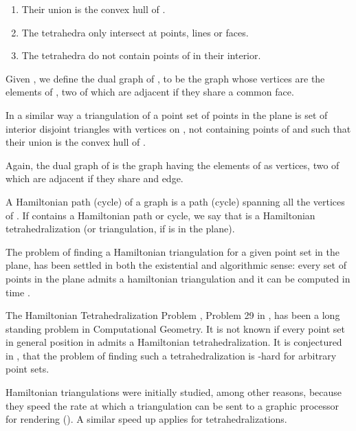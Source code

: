 \documentclass{article}
\begin{document}
\begin{enumerate}
\item Their union is the convex hull of .

 \item The tetrahedra only intersect at points, lines
or faces.

    \item The tetrahedra do not contain points of  in
their interior.
\end{enumerate}

Given , we define the dual
graph of ,  to
be the graph whose vertices are the elements of 
, two of which are adjacent if they
share a common face.\par

In a similar way a triangulation of a point set of points   
in the plane is set of interior 
disjoint triangles
with vertices on , not containing points of 
and such that their union is the convex hull of .\par

Again, the dual graph  of  is the graph having
 the elements of  as vertices, two of which
are adjacent if they share and edge.\par

A Hamiltonian path (cycle) of a graph  is a path (cycle)
spanning all the vertices of . If  contains
a Hamiltonian path or cycle, we say that 
is a Hamiltonian tetrahedralization (or triangulation, if  is in
the plane).\par

The problem of finding a Hamiltonian triangulation for
a given point set in the plane, has been
settled in both the existential and algorithmic
sense: every set of  points in the plane 
admits a hamiltonian 
triangulation and it can be computed
in time  \cite{skiena, faurr}.

The Hamiltonian Tetrahedralization Problem 
\cite{skiena}, Problem 29 in \cite{open}, 
has been a long standing problem in 
Computational Geometry.
It is not known if every point set in general
position in  admits
a Hamiltonian tetrahedralization.
It is conjectured in \cite{skiena}, that the
problem of finding such a tetrahedralization
is -hard for arbitrary point sets.\par

Hamiltonian triangulations were initially studied,
among other reasons, because they speed
the rate at which a triangulation can be sent
to a graphic processor for rendering (\cite{skiena, spacetradeoffs}).
A similar speed up applies for tetrahedralizations.\par
\end{document}
